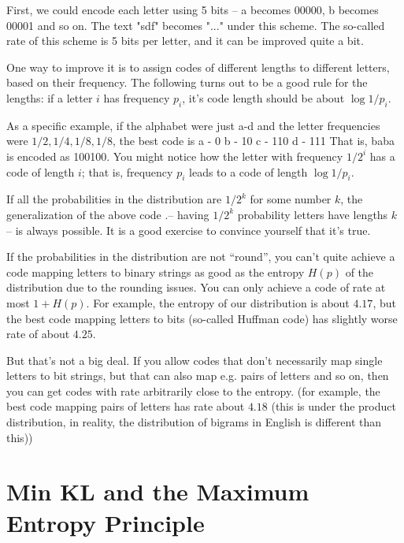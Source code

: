 \documentclass{article}
\begin{document}
First, we could encode each letter using 5 bits -- a becomes 00000, b becomes 00001 and so on. The text "sdf" becomes "..." under this scheme. The so-called rate of this scheme is 5 bits per letter, and it can be improved quite a bit. 
    
    
One way to improve it is to assign codes of different lengths to different letters, based on their frequency. The following turns out to be a good rule for the lengths: if a letter $i$ has frequency $p_i$, it's code length should be about $\log 1/p_i$. 

As a specific example, if the alphabet were just a-d and the letter frequencies were $1/2, 1/4, 1/8, 1/8$, the best code is
a - 0
b - 10
c - 110
d - 111
That is, baba is encoded as 100100. 
You might notice how the letter with frequency $1/2^i$ has a code of length $i$; that is, frequency $p_i$ leads to a code of length $\log 1/p_i$. 

If all the probabilities in the distribution are $1/2^k$ for some number $k$, the generalization of the above code .-- having $1/2^k$ probability letters have lengths $k$ --  is always possible. It is a good exercise to convince yourself that it's true.

If the probabilities in the distribution are not ``round'', you can't quite achieve a code mapping letters to binary strings as good as the entropy $H(p)$ of the distribution due to the rounding issues. You can only achieve a code of rate at most $1 + H(p)$. For example, the entropy of our distribution is about $4.17$, but the best code mapping letters to bits (so-called Huffman code) has slightly worse rate of about $4.25$. 

But that's not a big deal. If you allow codes that don't necessarily map single letters to bit strings, but that can also map e.g. pairs of letters and so on, then you can get codes with rate arbitrarily close to the entropy. (for example, the best code mapping pairs of letters has rate about $4.18$ (this is under the product distribution, in reality, the distribution of bigrams in English is different than this))


\section{Min KL and the Maximum Entropy Principle}

\end{document}
